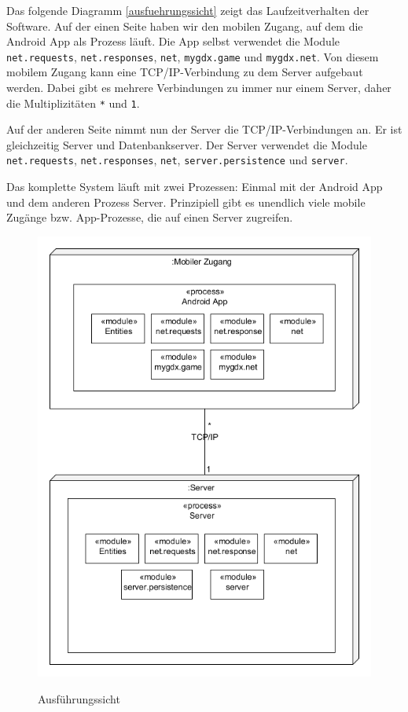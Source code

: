 Das folgende Diagramm \vref{ausfuehrungssicht} zeigt das Laufzeitverhalten der Software.
Auf der einen Seite haben wir den mobilen Zugang, auf dem die Android App als Prozess läuft. Die App selbst verwendet die Module \texttt{net.requests}, \texttt{net.responses}, \texttt{net}, \texttt{mygdx.game} und \texttt{mygdx.net}. Von diesem mobilem Zugang kann eine TCP/IP-Verbindung zu dem Server aufgebaut werden. Dabei gibt es mehrere Verbindungen zu immer nur einem Server, daher die Multiplizitäten \texttt{*} und \texttt{1}.

Auf der anderen Seite nimmt nun der Server die TCP/IP-Verbindungen an. Er ist gleichzeitig Server und Datenbankserver. Der Server verwendet die Module \texttt{net.requests}, \texttt{net.responses}, \texttt{net}, \texttt{server.persistence} und \texttt{server}.

Das komplette System läuft mit zwei Prozessen: Einmal mit der Android App und dem anderen Prozess Server. Prinzipiell gibt es unendlich viele mobile Zugänge bzw. App-Prozesse, die auf einen Server zugreifen.

\begin{figure} [H] 
\caption{Ausführungssicht} 
	\includegraphics[width=1\textwidth]{Diagramme/ausfuehrungssicht.png} 
	\label{ausfuehrungssicht} 
\end{figure}
